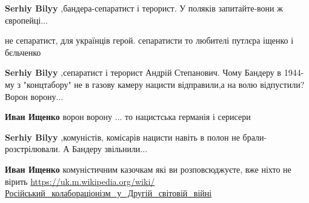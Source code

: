 \begin{itemize}
\begin{itemize}
\textbf{Serhiy Bilyy} ,бандера-сепаратист і терорист. У поляків запитайте-вони ж європейці...

 
не сепаратист, для українців герой. сепаратисти то любителі путлєра іщенко і бєльченко

 
\textbf{Serhiy Bilyy} ,сепаратист і терорист Андрій Степанович. Чому Бандеру в
1944-му з "концтабору" не в газову камеру нацисти відправили,а на волю
відпустили? Ворон ворону...

 
\textbf{Иван Ищенко} ворон ворону ... то нацистська германія і серисери

 
\textbf{Serhiy Bilyy} ,комуністів, комісарів нацисти навіть в полон не брали-розстрілювали. А Бандеру звільнили...

 
\textbf{Иван Ищенко} комуністичним казочкам які ви розповсюджуєте, вже ніхто не вірить
\url{https://uk.m.wikipedia.org/wiki/Російський_колабораціонізм_у_Другій_світовій_війні}

 

\end{itemize}
\end{itemize}
